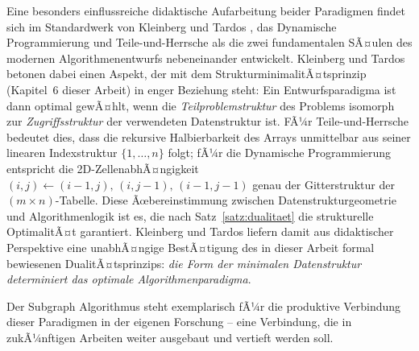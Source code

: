 ﻿\documentclass[a4paper,12pt]{article}
\theoremstyle{definition}
\begin{document}
Eine besonders einflussreiche didaktische Aufarbeitung beider Paradigmen findet sich
im Standardwerk von Kleinberg und Tardos \cite{kleinberg2005}, das Dynamische
Programmierung und Teile-und-Herrsche als die zwei fundamentalen SÃ¤ulen des
modernen Algorithmenentwurfs nebeneinander entwickelt. Kleinberg und Tardos
betonen dabei einen Aspekt, der mit dem StrukturminimalitÃ¤tsprinzip (Kapitel~6
dieser Arbeit) in enger Beziehung steht: Ein Entwurfsparadigma ist dann optimal
gewÃ¤hlt, wenn die \emph{Teilproblemstruktur} des Problems isomorph zur
\emph{Zugriffsstruktur} der verwendeten Datenstruktur ist. FÃ¼r Teile-und-Herrsche
bedeutet dies, dass die rekursive Halbierbarkeit des Arrays unmittelbar aus
seiner linearen Indexstruktur $\{1, \ldots, n\}$ folgt; fÃ¼r die Dynamische
Programmierung entspricht die 2D-ZellenabhÃ¤ngigkeit $(i,j) \leftarrow
(i{-}1,j),\,(i,j{-}1),\,(i{-}1,j{-}1)$ genau der Gitterstruktur der
$(m \times n)$-Tabelle. Diese Ãœbereinstimmung zwischen Datenstrukturgeometrie
und Algorithmenlogik ist es, die nach Satz~\ref{satz:dualitaet} die strukturelle
OptimalitÃ¤t garantiert. Kleinberg und Tardos liefern damit aus didaktischer
Perspektive eine unabhÃ¤ngige BestÃ¤tigung des in dieser Arbeit formal bewiesenen
DualitÃ¤tsprinzips: \emph{die Form der minimalen Datenstruktur determiniert
das optimale Algorithmenparadigma}.

Der Subgraph Algorithmus \cite{epp2026subgraph} steht exemplarisch fÃ¼r die
produktive Verbindung dieser Paradigmen in der eigenen Forschung -- eine Verbindung,
die in zukÃ¼nftigen Arbeiten weiter ausgebaut und vertieft werden soll.
\end{document}
